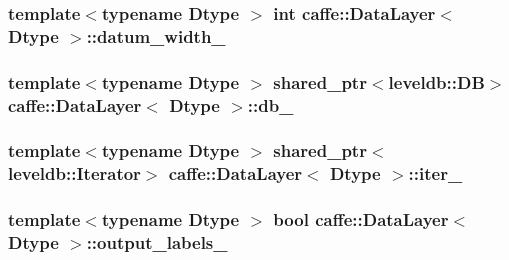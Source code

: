 \hypertarget{classcaffe_1_1_data_layer_a87acabb37f849641efdcb605031dc352}{
\subsubsection[{datum\+\_\+width\+\_\+}]{\setlength{\rightskip}{0pt plus 5cm}template$<$typename Dtype $>$ int {\bf caffe\+::\+Data\+Layer}$<$ Dtype $>$\+::datum\+\_\+width\+\_\+\hspace{0.3cm}{\ttfamily [protected]}}}\label{classcaffe_1_1_data_layer_a87acabb37f849641efdcb605031dc352}
\hypertarget{classcaffe_1_1_data_layer_a9287a92e591da10a3d6f38333aad301f}{
\subsubsection[{db\+\_\+}]{\setlength{\rightskip}{0pt plus 5cm}template$<$typename Dtype $>$ shared\+\_\+ptr$<$leveldb\+::\+D\+B$>$ {\bf caffe\+::\+Data\+Layer}$<$ Dtype $>$\+::db\+\_\+\hspace{0.3cm}{\ttfamily [protected]}}}\label{classcaffe_1_1_data_layer_a9287a92e591da10a3d6f38333aad301f}
\hypertarget{classcaffe_1_1_data_layer_a5f02294c8b3cf2a31f4e97accf3a23dd}{
\subsubsection[{iter\+\_\+}]{\setlength{\rightskip}{0pt plus 5cm}template$<$typename Dtype $>$ shared\+\_\+ptr$<$leveldb\+::\+Iterator$>$ {\bf caffe\+::\+Data\+Layer}$<$ Dtype $>$\+::iter\+\_\+\hspace{0.3cm}{\ttfamily [protected]}}}\label{classcaffe_1_1_data_layer_a5f02294c8b3cf2a31f4e97accf3a23dd}
\hypertarget{classcaffe_1_1_data_layer_ae2d9349591a22759acfce89a3ff7908a}{
\subsubsection[{output\+\_\+labels\+\_\+}]{\setlength{\rightskip}{0pt plus 5cm}template$<$typename Dtype $>$ bool {\bf caffe\+::\+Data\+Layer}$<$ Dtype $>$\+::output\+\_\+labels\+\_\+\hspace{0.3cm}{\ttfamily [protected]}}}\label{classcaffe_1_1_data_layer_ae2d9349591a22759acfce89a3ff7908a}
